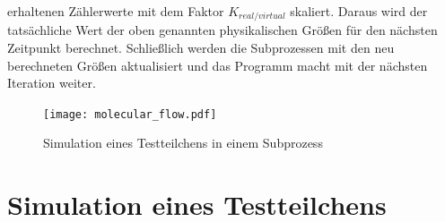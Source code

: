 \documentclass{listhesis}
\begin{document}
erhaltenen Zählerwerte mit dem Faktor $K_{real/virtual}$ skaliert. Daraus wird der tatsächliche Wert der oben genannten physikalischen Größen für den nächsten Zeitpunkt berechnet. Schließlich werden die Subprozessen mit den neu berechneten Größen aktualisiert und das Programm macht mit der nächsten Iteration weiter.

\begin{figure}[t]
\centering
\texttt{[image: molecular\_flow.pdf]}
\caption{Simulation eines Testteilchens in einem Subprozess}
\label{fig:simulation}
\end{figure}

\section{Simulation eines Testteilchens} \label{section:molflow}
\end{document}
